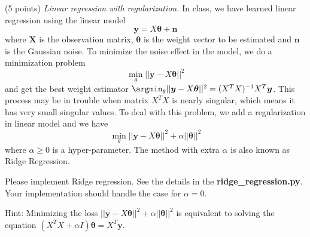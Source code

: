 \documentclass[a4paper, 12pt]{exam}
\begin{document}
	\begin{questions}
		\question (5 points) \emph{Linear regression with regularization.} In class, we have learned linear regression using the linear model
		\begin{equation*}
		\bm{y} = X\bm{\theta} + \bm{n}
		\end{equation*}
		where $\bm{X}$ is the observation matrix,
		$\bm{\theta}$ is the weight vector to be estimated and $\bm{n}$ is the Gaussian noise. To minimize the noise effect in the model, we do a minimization problem
		\begin{equation*}
		\min_{\theta}||\bm{y} - X\bm{\theta}||^2
		\end{equation*}
		and get the best weight estimator
		$\argmin_{\theta}||\bm{y} - X\bm{\theta}||^2 = (X^TX)^{-1}X^T\bm{y}$.
		This process may be in trouble when matrix $X^TX$ is nearly singular, which means it has very small singular values. %
		To deal with this problem, we add a regularization in linear model and we have
		\begin{equation*}
		\min_{\theta} ||\bm{y} - X\bm{\theta}||^2 + \alpha ||\bm{\theta}||^2
		\end{equation*}
		where $\alpha \geq 0$ is a hyper-parameter. The method with extra $\alpha$ is also known as Ridge Regression.
		
		Please implement Ridge regression. See the details in the \textbf{ridge\_regression.py}.
		Your implementation should handle the case for $\alpha=0$.
		
		Hint: Minimizing the loss $||\bm{y} - X\bm{\theta}||^2 + \alpha ||\bm{\theta}||^2$ is equivalent to solving the equation
		$( X^T X+ \alpha I)\bm{\theta}  = X^T \bm{y}$.
		

\end{questions}
\end{document}
